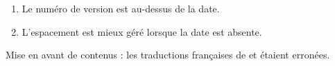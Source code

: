 \documentclass[12pt, a4paper]{article}
\begin{document}
\begin{tdocupdate}
    \item {}
    \begin{enumerate}
        \item Le numéro de version est au-dessus de la date.

        \item L'espacement est mieux géré lorsque la date est absente.
    \end{enumerate}
\end{tdocupdate}


\begin{tdocfix}
    \item Mise en avant de contenus : les traductions françaises de  et  étaient erronées.
\end{tdocfix}
\end{document}
